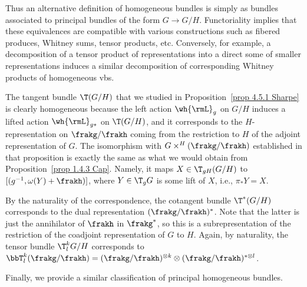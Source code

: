 Thus an alternative definition of homogeneous bundles is simply as bundles associated to principal bundles of the form $G\to G\slash H$. Functoriality implies that these equivalences are compatible with various constructions such as fibered produces, Whitney sums, tensor products, etc. Conversely, for example, a decomposition of a tensor product of representations into a direct some of smaller representations induces a similar decomposition of corresponding Whitney products of homogeneous \glspl{vb}.

\begin{example}\label{ex 1.4.3 Cap}
    The  tangent  bundle $\T(G\slash H)$ that we studied in Proposition~\ref{prop 4.5.1 Sharpe} is clearly homogeneous because the left action $\wh{\rmL}_g$ on $G\slash H$ induces a lifted action $\wh{\rmL}_{g\ast}$ on $\T(G\slash H)$, and it corresponds to the $H$-representation on $\frakg\slash \frakh$ coming from the restriction to $H$ of the adjoint representation of $G$. The isomorphism with $G\times^H (\frakg\slash\frakh)$ established in that proposition is exactly the same as what we would obtain from Proposition~\ref{prop 1.4.3 Cap}. Namely, it maps $X\in \T_{gH}(G\slash H)$ to $[(g^{-1},\omega(Y)+\frakh)]$, where $Y\in \T_g G$ is some lift of $X$, i.e., $\pi_\ast Y=X$.

    By the naturality of the correspondence, the cotangent bundle $\T^\ast(G\slash H)$ corresponds to the dual representation $(\frakg\slash\frakh)^\ast$. Note that the latter is just the annihilator of $\frakh$ in $\frakg^\ast$, so this is a subrepresentation of the restriction of the coadjoint representation of $G$ to $H$. Again, by naturality, the tensor bundle $\T^k_l G\slash H$ corresponds to $\bbT^k_l(\frakg\slash\frakh)=(\frakg\slash\frakh)^{\otimes k}\otimes (\frakg\slash\frakh)^{\ast\otimes l}$.
\end{example}


Finally, we provide a similar classification of principal homogeneous bundles.

